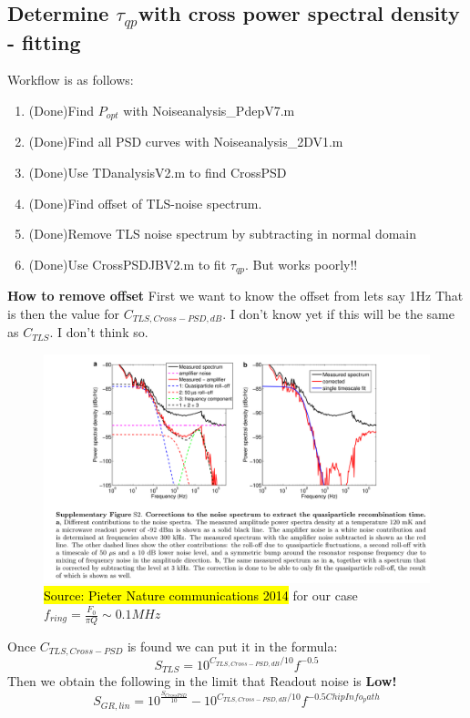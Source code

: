 \subsection*{Determine $\tau_{qp} $with cross power spectral density - fitting}
Workflow is as follows:
\begin{enumerate}
	\item (Done)Find $P_{opt}$ with Noiseanalysis\_PdepV7.m
	\item (Done)Find all PSD curves with Noiseanalysis\_2DV1.m
	\item (Done)Use TDanalysisV2.m to find CrossPSD
	\item (Done)Find offset of TLS-noise spectrum.
	\item (Done)Remove TLS noise spectrum by subtracting in normal domain
	\item (Done)Use CrossPSDJBV2.m to fit $\tau_{qp}$. But works poorly!!
\end{enumerate}
\textbf{How to remove offset}
First we want to know the offset from lets say 1Hz
That is then the value for $C_{TLS,Cross-PSD,dB}$. I don't know yet if this will be the same as $C_{TLS}$. I don't think so. 
\begin{figure}[h!!!!!!!!]
	\centering
	\includegraphics[width=.90\linewidth]{figures/ch5_measurement/Pieter_SupplementS2Fluctuations in the electron system of a superconductor exposed to a photon flux.png}
	\caption{\hl{Source: Pieter Nature communications 2014} for our case $f_{ring}= \frac{F_{0}}{\pi Q} \sim 0.1 MHz$}
	\label{fig:}
\end{figure}




Once $C_{TLS,Cross-PSD}$ is found we can put it in the formula:
$$S_{TLS} = 10^{C_{TLS,Cross-PSD,dB}/10}f^{-0.5}$$
Then we obtain the following in the limit that Readout noise is \textbf{Low!}
$$S_{GR,lin} = 10^{\frac{S_{CrossPSD}}{10}} - 10^{C_{TLS,Cross-PSD,dB}/10}f^{-0.5ChipInfo_path}$$


